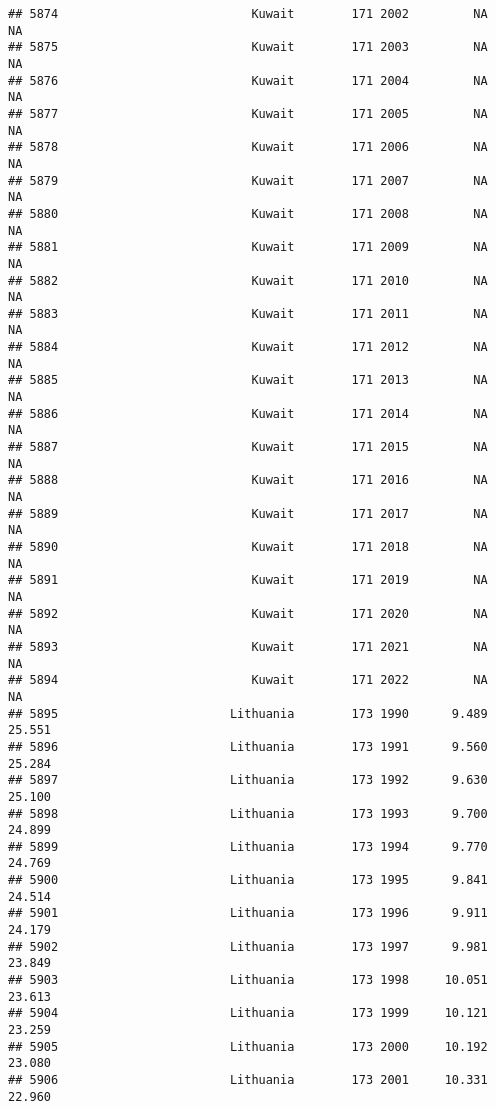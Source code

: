 \documentclass[
]{article}
\begin{document}
\begin{verbatim}
## 5874                           Kuwait        171 2002         NA         NA
## 5875                           Kuwait        171 2003         NA         NA
## 5876                           Kuwait        171 2004         NA         NA
## 5877                           Kuwait        171 2005         NA         NA
## 5878                           Kuwait        171 2006         NA         NA
## 5879                           Kuwait        171 2007         NA         NA
## 5880                           Kuwait        171 2008         NA         NA
## 5881                           Kuwait        171 2009         NA         NA
## 5882                           Kuwait        171 2010         NA         NA
## 5883                           Kuwait        171 2011         NA         NA
## 5884                           Kuwait        171 2012         NA         NA
## 5885                           Kuwait        171 2013         NA         NA
## 5886                           Kuwait        171 2014         NA         NA
## 5887                           Kuwait        171 2015         NA         NA
## 5888                           Kuwait        171 2016         NA         NA
## 5889                           Kuwait        171 2017         NA         NA
## 5890                           Kuwait        171 2018         NA         NA
## 5891                           Kuwait        171 2019         NA         NA
## 5892                           Kuwait        171 2020         NA         NA
## 5893                           Kuwait        171 2021         NA         NA
## 5894                           Kuwait        171 2022         NA         NA
## 5895                        Lithuania        173 1990      9.489     25.551
## 5896                        Lithuania        173 1991      9.560     25.284
## 5897                        Lithuania        173 1992      9.630     25.100
## 5898                        Lithuania        173 1993      9.700     24.899
## 5899                        Lithuania        173 1994      9.770     24.769
## 5900                        Lithuania        173 1995      9.841     24.514
## 5901                        Lithuania        173 1996      9.911     24.179
## 5902                        Lithuania        173 1997      9.981     23.849
## 5903                        Lithuania        173 1998     10.051     23.613
## 5904                        Lithuania        173 1999     10.121     23.259
## 5905                        Lithuania        173 2000     10.192     23.080
## 5906                        Lithuania        173 2001     10.331     22.960

\end{verbatim}
\end{document}

